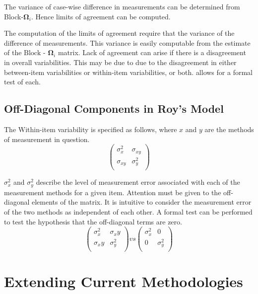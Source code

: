 \documentclass[12pt, a4paper]{report}
\theoremstyle{plain}
\theoremstyle{definition}
\theoremstyle{remark}
\begin{document}
The variance of case-wise difference in measurements can be determined from Block-$\boldsymbol{\Omega}_{i}$. Hence limits of agreement can be computed.


The computation of the limits of agreement require that the variance of the difference of measurements. This variance is easily computable from the estimate of the ${\mbox{Block - }\boldsymbol \Omega_{i}}$ matrix. Lack of agreement can arise if there is a disagreement in overall variabilities. This may be due to due to the disagreement in either between-item
variabilities or within-item variabilities, or both. \citet{ARoy2009} allows for a formal test of each.

\section{Off-Diagonal Components in Roy's Model}

The Within-item variability is specified as follows, where $x$ and $y$ are the methods of measurement in question.
\[ \left(
\begin{array}{cc}
\sigma^2_x & \sigma_{xy} \\
\sigma_{xy} & \sigma^2_y \\
\end{array}
\right)
\]

$\sigma^2_x$ and $\sigma^2_y$ describe the level of measurement error associated with each of the measurement methods for a given item. Attention must be given to the off-diagonal elements of the matrix. It is intuitive to consider the measurement error of the two methods as independent of each other. A formal test can be performed to test the hypothesis that the off-diagonal terms are zero.
\[ \left(
\begin{array}{cc}
\sigma^2_x & \sigma_xy \\
\sigma_xy & \sigma^2_y \\
\end{array}
\right) vs \left(
\begin{array}{cc}
\sigma^2_x & 0 \\
0 & \sigma^2_y \\
\end{array}
\right)
\]





\chapter{Extending Current Methodologies}
\end{document}
